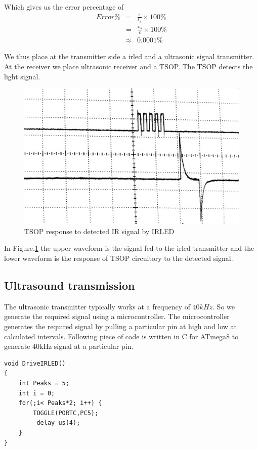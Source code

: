 Which gives us the error percentage of 
\begin{eqnarray*}
	Error \% & =& \frac{\epsilon}{t_s}\times 100\%\\
	{}& = & \frac{v_s}{c} \times 100 \%\\
	{}& \approx & 0.0001\% 
\end{eqnarray*}

We thus place at the transmitter side a \gls{irled} and a ultrasonic signal transmitter. At the receiver we place ultrasonic receiver and a TSOP. The TSOP detects the light signal.

\begin{figure}
	\centering
	\includegraphics[width=120mm]{Images/DetectionByTSOP.jpg}
	\caption{TSOP response to detected IR signal by IRLED}
	\label{fig:DetectionByTSOP}
\end{figure} 
In Figure.\ref{fig:DetectionByTSOP} the upper waveform is the signal fed to the \gls{irled} transmitter and the lower waveform is the response of TSOP circuitory to the detected signal.

\subsection{Ultrasound transmission}
The ultrasonic transmitter typically works at a frequency of $40kHz$. So we generate the required signal using  a microcontroller. The microcontroller generates the required signal by pulling a particular pin at high and low at calculated intervals. Following piece of code is written in C for ATmega8 to generate 40kHz signal at a particular pin.

\begin{lstlisting}
void DriveIRLED()
{
	int Peaks = 5;
	int i = 0;
	for(;i< Peaks*2; i++) {
		TOGGLE(PORTC,PC5);
		_delay_us(4);
	}
}
\end{lstlisting}

